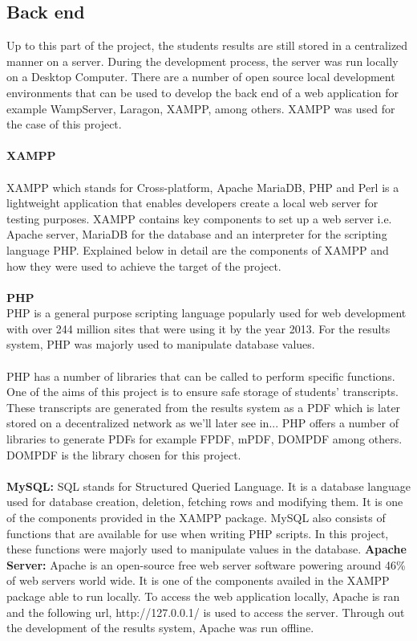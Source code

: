 \subsection{Back end}
Up to this part of the project, the students results are still stored in a centralized manner on a server. During the development process, the server was run locally on a Desktop Computer. There are a number of open source local development environments that can be used to develop the back end of a web application for example WampServer, Laragon, XAMPP, among others. XAMPP was used for the case of this project.\\~\\
\textbf{XAMPP}\\~\\
XAMPP which stands for Cross-platform, Apache MariaDB, PHP and Perl is a lightweight application that enables developers create a local web server for testing purposes. XAMPP contains key components to set up a web server i.e. Apache server, MariaDB for the database and an interpreter for the scripting language PHP. Explained below in detail are the components of XAMPP and how they were used to achieve the target of the project.\\~\\
\textbf{PHP }\\PHP is a general purpose scripting language popularly used for web development with over 244 million sites that were using it by the year 2013. For the results system, PHP was majorly used to manipulate database values.\\~\\
PHP has a number of libraries that can be called to perform specific functions. One of the aims of this project is to ensure safe storage of students' transcripts. These transcripts are generated from the results system as a PDF which is later stored on a decentralized network as we'll later see in... PHP offers a number of libraries to generate PDFs for example FPDF, mPDF, DOMPDF among others. DOMPDF is the library chosen for this project.\\~\\
\textbf{MySQL: }SQL stands for Structured Queried Language. It is a database language used for database creation, deletion, fetching rows and modifying them. It is one of the components provided in the XAMPP package. MySQL also consists of functions that are available for use when writing PHP scripts. In this project, these functions were majorly used to manipulate values in the database.
\textbf{Apache Server: }Apache is an open-source free web server software powering around 46\% of web servers world wide. It is one of the components availed in the XAMPP package able to run locally. To access the web application locally, Apache is ran and the following url, http://127.0.0.1/ is used to access the server. Through out the development of the results system, Apache was run offline.

